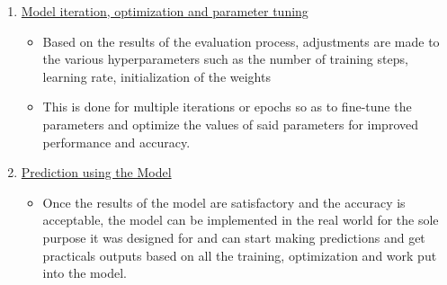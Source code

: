 \begin{enumerate}
      \item \underline {Model iteration, optimization and parameter tuning}
        \begin{itemize}
          \item Based on the results of the evaluation process, adjustments are made to the various hyperparameters such as the number of training steps, learning rate, initialization of the weights
          \item This is done for multiple iterations or epochs so as to fine-tune the parameters and optimize the values of said parameters for improved performance and accuracy.
        \end{itemize}

      \item \underline {Prediction using the Model}
        \begin{itemize}
          \item Once the results of the model are satisfactory and the accuracy is acceptable, the model can be implemented in the real world for the sole purpose it was designed for and can start making predictions and get practicals outputs based on all the training, optimization and work put into the model.
        \end{itemize}
    \end{enumerate}
